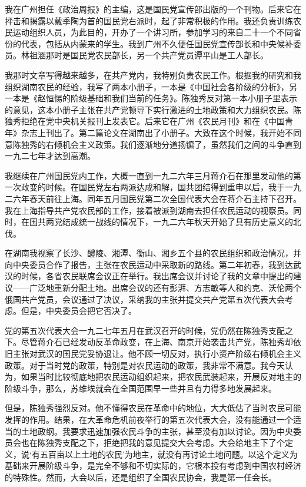 \documentclass[10pt]{book}
\begin{document}
我在广州担任《政治周报》的主编，这是国民党宣传部出版的一个刊物。后来它在抨击和揭露以戴季陶为首的国民党右派时，起了非常积极的作用。我还负责训练农民运动组织人员，为此目的，开办了一个讲习所，参加学习的来自二十一个不同省份的代表，包括从内蒙来的学生。我到广州不久便任国民党宣传部长和中央候补委员。林祖涵那时是国民党农民部长，另一个共产党员谭平山是工人部长。

我那时文章写得越来越多，在共产党内，我特别负责农民工作。根据我的研究和我组织湖南农民的经验，我写了两本小册子，一本是《中国社会各阶级的分析》，另一本是《赵恒惕的阶级基础和我们当前的任务》。陈独秀反对第一本小册子里表示的意见，这本小册子主张在共产党顿导下实行激进的土地政策和大力组织农民。陈独秀拒绝在党中央机关报刊上发表它。后来它在广州《农民月刊》和在《中国青年》杂志上刊出了。第二篇论文在湖南出了小册子。大致在这个时候，我开始不同意陈独秀的右倾机会主义政策。我们逐渐地分道扬镳了，虽然我们之间的斗争直到一九二七年才达到高潮。

我继续在广州国民党内工作，大概一直到一九二六年三月蒋介石在那里发动他的第一次政变的时候。在国民党左右两派达成和解，国共团结得到重申以后，我于一九二六年春天前往上海。同年五月国民党第二次全国代表大会在蒋介石主持下召开。我在上海指导共产党农民部的工作，接着被派到湖南去担任农民运动的视察员。同时，在国共两党结成统一战线的情况下，一九二六年秋天开始了具有历史意义的北伐。

在湖南我视察了长沙、醴陵、湘潭、衡山、湘乡五个县的农民组织和政治情况，并向中央委员合作了报告，主张在农民运动中采取新的路线。第二年初春，我到达武汉的时候，各省农民联席会议正在举行。我出席会议并讨论了我的文章中提出的建议——广泛地重新分配土地。出席会议的还有彭湃、方志敏等人和约克、沃伦两个俄国共产党员，会议通过了决议，采纳我的主张并提交共产党第五次代表大会考虑。但是，中央委员会把它否决了。

党的第五次代表大会一九二七年五月在武汉召开的时候，党仍然在陈独秀支配之下。尽管蒋介石已经发动反革命政变，在上海、南京开始袭击共产党，陈独秀却依旧主张对武汉的国民党妥协退让。他不顾一切反对，执行小资产阶级右倾机会主义政策。对于当时党的政策，特别是对农民运动的政策，我非常不满意。我今天认为，如果当时比较彻底地把农民运动组织起来，把农民武装起来，开展反对地主的阶级斗争，那么，苏维埃就会在全国范围早一些并且有力得多地发展起来。

但是，陈独秀强烈反对。他不懂得农民在革命中的地位，大大低估了当时农民可能发挥的作用。结果，在大革命危机前夜举行的第五次代表大会，没有能通过一个适当的土地政纲。我要求迅速加强农民斗争的主张，甚至没有加以讨论。因为中央委员会也在陈独秀支配之下，拒绝把我的意见提交大会考虑。大会给地主下了个定义，说‘有五百亩以上土地的农民’为地主，就没有再讨论土地问题。以这个定义为基础来开展阶级斗争，是完全不够和不切实际的，它根本投有考虑到中国农村经济的特殊性。然而，大会以后，还是组织了全国农民协会，我是第一任会长。
\end{document}
